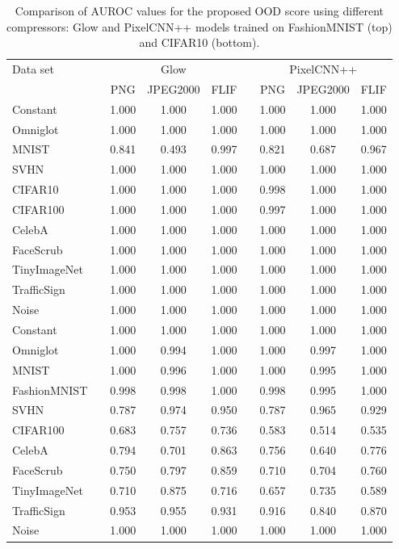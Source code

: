 \documentclass[letterpaper]{article} \usepackage{iclr2020_conference,times}
\begin{document}
\begin{table}[ht]
\caption{Comparison of AUROC values for the proposed OOD score  using different compressors: Glow and PixelCNN++ models trained on FashionMNIST (top) and CIFAR10 (bottom).}
\label{tab:compressors}
\begin{center}
\setlength\tabcolsep{8pt}
\begin{tabular}{lcccccccc}
\hline
Data set        & & \multicolumn{3}{c}{Glow}    & & \multicolumn{3}{c}{PixelCNN++}  \\
\cline{3-5}\cline{7-9}
                & & PNG     & JPEG2000  & FLIF  & & PNG     & JPEG2000  & FLIF  \\
\hline
Constant & & 1.000 & 1.000 & 1.000 & & 1.000 & 1.000 & 1.000 \\
Omniglot & & 1.000 & 1.000 & 1.000 & & 1.000 & 1.000 & 1.000 \\
MNIST & & 0.841 & 0.493 & 0.997	& & 0.821 & 0.687 & 0.967 \\
SVHN & & 1.000 & 1.000 & 1.000 &  & 1.000 & 1.000 & 1.000 \\
CIFAR10 & & 1.000 & 1.000 & 1.000 & & 0.998 & 1.000 & 1.000 \\
CIFAR100 & & 1.000 & 1.000 & 1.000 &  & 0.997 & 1.000 & 1.000 \\
CelebA & & 1.000 & 1.000 & 1.000 & & 1.000 & 1.000 & 1.000 \\
FaceScrub & & 1.000 & 1.000 & 1.000 &  & 1.000 & 1.000 & 1.000 \\
TinyImageNet & & 1.000 & 1.000 & 1.000 &  & 1.000 & 1.000 & 1.000 \\
TrafficSign & & 1.000 & 1.000 & 1.000 &  & 1.000 & 1.000 & 1.000 \\
Noise & & 1.000 & 1.000 & 1.000 &  & 1.000 & 1.000 & 1.000 \\
\hline
Constant & & 1.000 & 1.000 & 1.000 & & 1.000 & 1.000 & 1.000 \\
Omniglot & & 1.000 & 0.994 & 1.000 & & 1.000 & 0.997 & 1.000 \\
MNIST & & 1.000 & 0.996 & 1.000 &  & 1.000 & 0.995 & 1.000 \\
FashionMNIST & & 0.998 & 0.998 & 1.000 &  & 0.998 & 0.995 & 1.000 \\
SVHN & & 0.787 & 0.974 & 0.950 &  & 0.787 & 0.965 & 0.929 \\
CIFAR100 & & 0.683 & 0.757 & 0.736 &  & 0.583 & 0.514 & 0.535 \\
CelebA & & 0.794 & 0.701 & 0.863 &  & 0.756 & 0.640 & 0.776 \\
FaceScrub & & 0.750 & 0.797 & 0.859 &  & 0.710 & 0.704 & 0.760 \\
TinyImageNet & & 0.710 & 0.875 & 0.716 & & 0.657 & 0.735 & 0.589 \\
TrafficSign & & 0.953  & 0.955 & 0.931 &  & 0.916 & 0.840 & 0.870 \\
Noise & & 1.000 & 1.000 & 1.000 & & 1.000 & 1.000 & 1.000 \\
\hline
\end{tabular}
\end{center}
\end{table}
\clearpage{}
\end{document}
